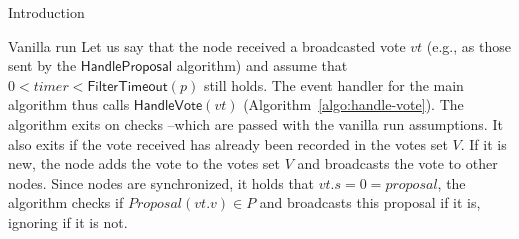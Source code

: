 \documentclass[10pt,a4paper]{article}
\begin{document}
\begin{section}{Introduction}
\begin{subsection}{Vanilla run}
Let us say that the node received a broadcasted vote $vt$ (e.g., as those sent by the $\mathsf{HandleProposal}$ 
algorithm) and assume that $0<timer<\mathsf{FilterTimeout}(p)$ still holds.
The event handler for the main algorithm thus calls $\mathsf{HandleVote}(vt)$ (Algorithm~\ref{algo:handle-vote}).
The algorithm exits on checks --which are passed with the vanilla run assumptions.
It also exits if the vote received has already been recorded in the votes set $V$.
If it is new, the node adds the vote to the votes set $V$ and broadcasts the vote 
to other nodes.
Since nodes are synchronized, it holds that $vt.s=0=proposal$, the algorithm checks if 
$Proposal(vt.v)\in P$ and broadcasts this proposal if it is, ignoring if it is not.




\end{subsection}
\end{section}
\end{document}
